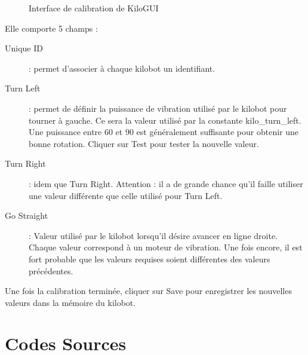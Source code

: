 \documentclass[a4paper,8pt]{report}
\begin{document}
\begin{figure}[!h]
    \centering
    \caption{Interface de calibration de KiloGUI}
\end{figure}

Elle comporte 5 champs :

\begin{description}
\item[Unique ID] : permet d'associer à chaque kilobot un identifiant.
\item[Turn Left] : permet de définir la puissance de vibration utilisé par le kilobot pour tourner à gauche. Ce sera la valeur utilisé par la constante kilo\_turn\_left. Une puissance entre 60 et 90 est généralement suffisante pour obtenir une bonne rotation. Cliquer sur Test pour tester la nouvelle valeur.
\item[Turn Right] : idem que Turn Right. Attention : il a de grande chance qu'il faille utiliser une valeur différente que celle utilisé pour Turn Left.
\item[Go Straight] : Valeur utilisé par le kilobot lorsqu'il désire avancer en ligne droite. Chaque valeur correspond à un moteur de vibration. Une fois encore, il est fort probable que les valeurs requises soient différentes des valeurs précédentes.
\end{description}

Une fois la calibration terminée, cliquer sur Save pour enregistrer les nouvelles valeurs dans la mémoire du kilobot.

\newpage
\section*{Codes Sources}\label{sec:name}
\end{document}
